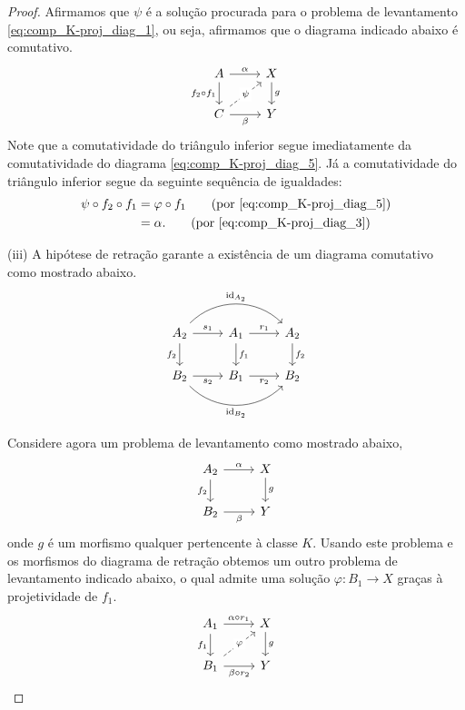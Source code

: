 \begin{proof}
  Afirmamos que $\psi$ é a solução procurada para o problema de levantamento \eqref{eq:comp_K-proj_diag_1}, ou seja, afirmamos que o diagrama indicado abaixo é comutativo.
  \begin{displaymath}
    \begin{tikzcd}
      A
      \arrow[r, "\alpha"]
      \arrow[d, "f_2 \circ f_1" swap]
      & X
      \arrow[d, "g"]
      \\ C
      \arrow[r, "\beta" swap]
      \arrow[ru, dashed, "\psi" description]
      & Y
    \end{tikzcd}
  \end{displaymath}
  Note que a comutatividade do triângulo inferior segue imediatamente da comutatividade do diagrama \eqref{eq:comp_K-proj_diag_5}.
  Já a comutatividade do triângulo inferior segue da seguinte sequência de igualdades:
  \begin{align*}
    \psi \circ f_2 \circ f_1
    & = \varphi \circ f_1
    \tag{por \eqref{eq:comp_K-proj_diag_5}} \\
    & = \alpha.
    \tag{por \eqref{eq:comp_K-proj_diag_3}}
  \end{align*}

  \smallskip
  (iii) A hipótese de retração garante a existência de um diagrama comutativo como mostrado abaixo.
  \begin{equation}\label{eq:retracao_K-proj_diag_1}
    \begin{tikzcd}
      A_2
      \arrow[r, "s_1"]
      \arrow[d, "f_2" swap]
      \arrow[rr, bend left=45, "\id_{A_2}"]
      & A_1
      \arrow[r, "r_1"]
      \arrow[d, "f_1"]
      & A_2
      \arrow[d, "f_2"]
      \\ B_2
      \arrow[r, "s_2" swap]
      \arrow[rr, bend right=45, "\id_{B_2}" swap]
      & B_1
      \arrow[r, "r_2" swap]
      & B_2
    \end{tikzcd}
  \end{equation}

  Considere agora um problema de levantamento como mostrado abaixo,
  \begin{displaymath}
    \begin{tikzcd}
      A_2
      \arrow[r, "\alpha"]
      \arrow[d, "f_2" swap]
      & X
      \arrow[d, "g"]
      \\ B_2
      \arrow[r, "\beta" swap]
      & Y
    \end{tikzcd}
  \end{displaymath}
  onde $g$ é um morfismo qualquer pertencente à classe $K$.
  Usando este problema e os morfismos do diagrama de retração obtemos um outro problema de levantamento indicado abaixo, o qual admite uma solução $\varphi: B_1 \to X$ graças à projetividade de $f_1$.
  \begin{equation}\label{eq:retracao_K-proj_diag_3}
    \begin{tikzcd}
      A_1
      \arrow[r, "\alpha \circ r_1"]
      \arrow[d, "f_1" swap]
      & X
      \arrow[d, "g"]
      \\ B_1
      \arrow[r, "\beta \circ r_2" swap]
      \arrow[ru, dashed, "\varphi" description]
      & Y
    \end{tikzcd}
  \end{equation}


\end{proof}
